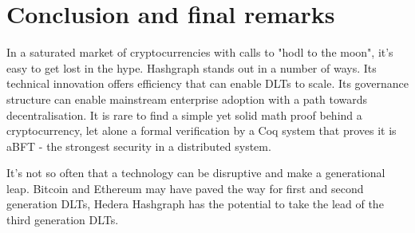 \section{Conclusion and final remarks}

In a saturated market of cryptocurrencies with calls to "hodl to the moon", it's easy to get lost in the hype. Hashgraph stands out in a number of ways. Its technical innovation offers efficiency that can enable DLTs to scale. Its governance structure can enable mainstream enterprise adoption with a path towards decentralisation. It is rare to find a simple yet solid math proof behind a cryptocurrency, let alone a formal verification by a Coq system that proves it is aBFT - the strongest security in a distributed system.

It's not so often that a technology can be disruptive and make a generational leap. Bitcoin and Ethereum may have paved the way for first and second generation DLTs, Hedera Hashgraph has the potential to take the lead of the third generation DLTs.
